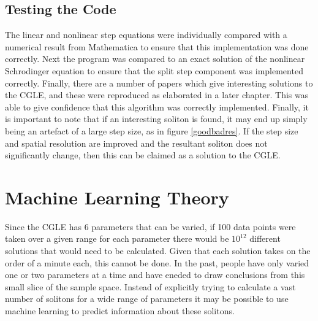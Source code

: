 \documentclass[a4paper,12pt]{report}
\begin{document}
\section{Testing the Code}
The linear and nonlinear step equations were individually compared with a numerical result from Mathematica to ensure that this implementation was done correctly. Next the program was compared to an exact solution of the nonlinear Schrodinger equation to ensure that the split step component was implemented correctly. 
Finally, there are a number of papers which give interesting solutions to the CGLE, and these were reproduced as elaborated in a later chapter. This was able to give confidence that this algorithm was correctly implemented. 
Finally, it is important to note that if an interesting soliton is found, it may end up simply being an artefact of a large step size, as in figure \ref{goodbadres}. If the step size and spatial resolution are improved and the resultant soliton does not significantly change, then this can be claimed as a solution to the CGLE.








\chapter{Machine Learning Theory}
Since the CGLE has 6 parameters that can be varied, if 100 data points were taken over a given range for each parameter there would be $10^{12}$ different solutions that would need to be calculated. Given that each solution takes on the order of a minute each, this cannot be done. In the past, people have only varied one or two parameters at a time and have eneded to draw conclusions from this small slice of the sample space.\cite{2001, spiny, spike, extreme} Instead of explicitly trying to calculate a vast number of solitons for a wide range of parameters it may be possible to use machine learning to predict information about these solitons.
\end{document}
